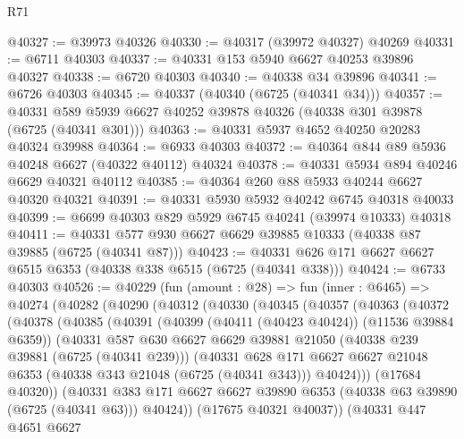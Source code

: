 \begin{lexlean}{R71}
\begin{coremodule}
@40327 := @39973 @40326
@40330 := @40317 (@39972 @40327) @40269
@40331 := @6711 @40303
@40337 := @40331 @153 @5940 @6627 @40253 @39896 @40327
@40338 := @6720 @40303
@40340 := @40338 @34 @39896
@40341 := @6726 @40303
@40345 := @40337 (@40340 (@6725 (@40341 @34)))
@40357 := @40331 @589 @5939 @6627 @40252 @39878 @40326 (@40338 @301 @39878 (@6725 (@40341 @301)))
@40363 := @40331 @5937 @4652 @40250 @20283 @40324 @39988
@40364 := @6933 @40303
@40372 := @40364 @844 @89 @5936 @40248 @6627 (@40322 @40112) @40324
@40378 := @40331 @5934 @894 @40246 @6629 @40321 @40112
@40385 := @40364 @260 @88 @5933 @40244 @6627 @40320 @40321
@40391 := @40331 @5930 @5932 @40242 @6745 @40318 @40033
@40399 := @6699 @40303 @829 @5929 @6745 @40241 (@39974 @10333) @40318
@40411 := @40331 @577 @930 @6627 @6629 @39885 @10333 (@40338 @87 @39885 (@6725 (@40341 @87)))
@40423 := @40331 @626 @171 @6627 @6627 @6515 @6353 (@40338 @338 @6515 (@6725 (@40341 @338)))
@40424 := @6733 @40303
@40526 := @40229
    (fun (amount : @28) =>
    fun (inner : @6465) =>
    @40274
      (@40282
        (@40290
          (@40312
            (@40330
              (@40345
                (@40357
                  (@40363
                    (@40372
                      (@40378
                        (@40385
                          (@40391
                            (@40399 (@40411 (@40423 @40424)) (@11536 @39884 @6359))
                            (@40331
                              @587
                              @630
                              @6627
                              @6629
                              @39881
                              @21050
                              (@40338 @239 @39881 (@6725 (@40341 @239)))
                              (@40331
                                @628
                                @171
                                @6627
                                @6627
                                @21048
                                @6353
                                (@40338 @343 @21048 (@6725 (@40341 @343)))
                                @40424)))
                          (@17684 @40320))
                        (@40331
                          @383
                          @171
                          @6627
                          @6627
                          @39890
                          @6353
                          (@40338 @63 @39890 (@6725 (@40341 @63)))
                          @40424))
                      (@17675 @40321 @40037))
                    (@40331
                      @447
                      @4651
                      @6627

\end{coremodule}
\end{lexlean}
